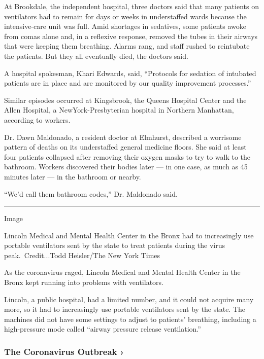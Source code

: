 At Brookdale, the independent hospital, three doctors said that many
patients on ventilators had to remain for days or weeks in understaffed
wards because the intensive-care unit was full. Amid shortages in
sedatives, some patients awoke from comas alone and, in a reflexive
response, removed the tubes in their airways that were keeping them
breathing. Alarms rang, and staff rushed to reintubate the patients. But
they all eventually died, the doctors said.

A hospital spokesman, Khari Edwards, said, ``Protocols for sedation of
intubated patients are in place and are monitored by our quality
improvement processes.''

Similar episodes occurred at Kingsbrook, the Queens Hospital Center and
the Allen Hospital, a NewYork-Presbyterian hospital in Northern
Manhattan, according to workers.

Dr. Dawn Maldonado, a resident doctor at Elmhurst, described a worrisome
pattern of deaths on its understaffed general medicine floors. She said
at least four patients collapsed after removing their oxygen masks to
try to walk to the bathroom. Workers discovered their bodies later ---
in one case, as much as 45 minutes later --- in the bathroom or nearby.

``We'd call them bathroom codes,'' Dr. Maldonado said.

\begin{center}\rule{0.5\linewidth}{\linethickness}\end{center}

Image

Lincoln Medical and Mental Health Center in the Bronx had to
increasingly use portable ventilators sent by the state to treat
patients during the virus peak.~Credit...Todd Heisler/The New York Times

As the coronavirus raged, Lincoln Medical and Mental Health Center in
the Bronx kept running into problems with ventilators.

Lincoln, a public hospital, had a limited number, and it could not
acquire many more, so it had to increasingly use portable ventilators
sent by the state. The machines did not have some settings to adjust to
patients' breathing, including a high-pressure mode called ``airway
pressure release ventilation.''

\href{https://www.nytimes3xbfgragh.onion/news-event/coronavirus?action=click\&pgtype=Article\&state=default\&region=MAIN_CONTENT_3\&context=storylines_faq}{}

\hypertarget{the-coronavirus-outbreak-}{%
\subsubsection{The Coronavirus Outbreak
›}\label{the-coronavirus-outbreak-}}

